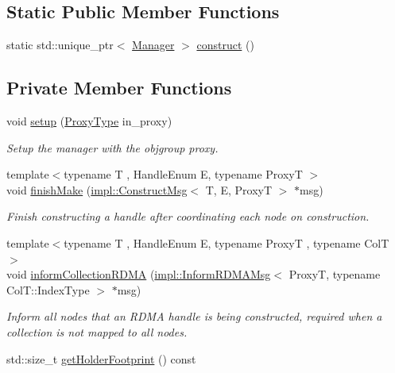 \subsection*{Static Public Member Functions}
\begin{DoxyCompactItemize}
\item 
static std\+::unique\+\_\+ptr$<$ \hyperlink{structvt_1_1rdma_1_1_manager}{Manager} $>$ \hyperlink{structvt_1_1rdma_1_1_manager_ab79a91b3feabfc37e6f0b5000e9d3949}{construct} ()
\end{DoxyCompactItemize}
\subsection*{Private Member Functions}
\begin{DoxyCompactItemize}
\item 
void \hyperlink{structvt_1_1rdma_1_1_manager_a15ba4b8e5b58df7f050fc1cdaf5f2bcd}{setup} (\hyperlink{structvt_1_1rdma_1_1_manager_a75d5cdc6428ea19f5ec665b04dcd7166}{Proxy\+Type} in\+\_\+proxy)
\begin{DoxyCompactList}\small\item\em Setup the manager with the objgroup proxy. \end{DoxyCompactList}\item 
{\footnotesize template$<$typename T , Handle\+Enum E, typename ProxyT $>$ }\\void \hyperlink{structvt_1_1rdma_1_1_manager_a462f2059efb91643275a921c84f72f67}{finish\+Make} (\hyperlink{structvt_1_1rdma_1_1impl_1_1_construct_msg}{impl\+::\+Construct\+Msg}$<$ T, E, ProxyT $>$ $\ast$msg)
\begin{DoxyCompactList}\small\item\em Finish constructing a handle after coordinating each node on construction. \end{DoxyCompactList}\item 
{\footnotesize template$<$typename T , Handle\+Enum E, typename ProxyT , typename ColT $>$ }\\void \hyperlink{structvt_1_1rdma_1_1_manager_a5dfbaf5c43691eaf3dcce5b14c4d8951}{inform\+Collection\+R\+D\+MA} (\hyperlink{structvt_1_1rdma_1_1impl_1_1_inform_r_d_m_a_msg}{impl\+::\+Inform\+R\+D\+M\+A\+Msg}$<$ ProxyT, typename Col\+T\+::\+Index\+Type $>$ $\ast$msg)
\begin{DoxyCompactList}\small\item\em Inform all nodes that an R\+D\+MA handle is being constructed, required when a collection is not mapped to all nodes. \end{DoxyCompactList}\item 
std\+::size\+\_\+t \hyperlink{structvt_1_1rdma_1_1_manager_a341e3d63c3834276b770c33ca6445188}{get\+Holder\+Footprint} () const
\end{DoxyCompactItemize}
